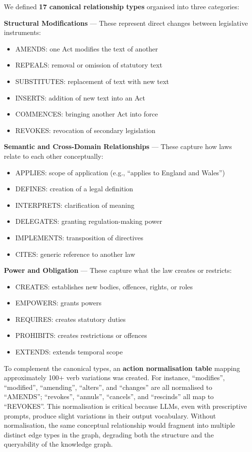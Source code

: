 \documentclass[10pt, a4paper, twocolumn]{article}
\begin{document}
We defined \textbf{17 canonical relationship types} organised into three categories:

\textbf{Structural Modifications} — These represent direct changes between legislative instruments:
\begin{itemize}
    \item AMENDS: one Act modifies the text of another
    \item REPEALS: removal or omission of statutory text
    \item SUBSTITUTES: replacement of text with new text
    \item INSERTS: addition of new text into an Act
    \item COMMENCES: bringing another Act into force
    \item REVOKES: revocation of secondary legislation
\end{itemize}

\textbf{Semantic and Cross-Domain Relationships} — These capture how laws relate to each other conceptually:
\begin{itemize}
    \item APPLIES: scope of application (e.g., ``applies to England and Wales'')
    \item DEFINES: creation of a legal definition
    \item INTERPRETS: clarification of meaning
    \item DELEGATES: granting regulation-making power
    \item IMPLEMENTS: transposition of directives
    \item CITES: generic reference to another law
\end{itemize}

\textbf{Power and Obligation} — These capture what the law creates or restricts:
\begin{itemize}
    \item CREATES: establishes new bodies, offences, rights, or roles
    \item EMPOWERS: grants powers
    \item REQUIRES: creates statutory duties
    \item PROHIBITS: creates restrictions or offences
    \item EXTENDS: extends temporal scope
\end{itemize}

To complement the canonical types, an \textbf{action normalisation table} mapping approximately 100+ verb variations was created. For instance, ``modifies'', ``modified'', ``amending'', ``alters'', and ``changes'' are all normalised to ``AMENDS''; ``revokes'', ``annuls'', ``cancels'', and ``rescinds'' all map to ``REVOKES''. This normalisation is critical because LLMs, even with prescriptive prompts, produce slight variations in their output vocabulary. Without normalisation, the same conceptual relationship would fragment into multiple distinct edge types in the graph, degrading both the structure and the queryability of the knowledge graph.
\end{document}
